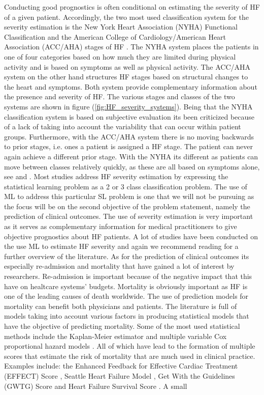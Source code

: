 \documentclass[../thesis.tex]{subfiles}
\begin{document}
\indent Conducting good prognostics is often conditional on estimating the severity of HF of a given patient. Accordingly, the two most used classification system for the severity estimation is the New York Heart Association (NYHA) Functional Classification \citep{new1994nomenclature} and the American College of Cardiology/American Heart Association (ACC/AHA) stages of HF \citep{hunt2001acc}. The NYHA system places the patients in one of four categories based on how much they are limited during physical activity and is based on symptoms as well as physical activity. The ACC/AHA system on the other hand structures HF stages based on structural changes to the heart and symptoms. Both system provide complementary information about the presence and severity of HF. The various stages and classes of the two systems are shown in figure (\ref{fig:HF_severity_systems}). Being that the NYHA classification system is based on subjective evaluation its been criticized because of a lack of taking into account the variability that can occur within patient groups. Furthermore, with the ACC/AHA system there is no moving backwards to prior stages, i.e. ones a patient is assigned a HF stage. The patient can never again achieve a different prior stage. With the NYHA its different as patients can move between classes relatively quickly, as these are all based on symptoms alone, see \cite{fleg2000assessment} and \cite{yancy2013}. Most studies address HF severity estimation by expressing the statistical learning problem as a 2 or 3 class classification problem. The use of ML to address this particular SL problem is one that we will not be pursuing as the focus will be on the second objective of the problem statement, namely the prediction of clinical outcomes. The use of severity estimation is very important as it serves as complementary information for medical practitioners to give objective prognostics about HF patients. A lot of studies have been conducted on the use ML to estimate HF severity and again we recommend reading \cite{tripoliti2017heart} for a further overview of the literature. As for the prediction of clinical outcomes its especially re-admission and mortality that have gained a lot of interest by researchers. Re-admission is important because of the negative impact that this have on healtcare systems' budgets. Mortality is obviously important as HF is one of the leading causes of death worldwide. The use of prediction models for mortality can benefit both physicians and patients. The literature is full of models taking into account various factors in producing statistical models that have the objective of predicting mortality. Some of the most used statistical methods include the Kaplan-Meier estimator \citep{kaplan1958nonparametric} and multiple variable Cox proportional hazard models \citep{cox1972regression}. All of which have lead to the formation of multiple scores that estimate the risk of mortality that are much used in clinical practice. Examples include: the Enhanced Feedback for Effective Cardiac Treatment (EFFECT) Score \citep{lee2003predicting}, Seattle Heart Failure Model \citep{levy2006seattle}, Get With the Guidelines (GWTG) Score \citep{peterson2010validated} and Heart Failure Survival Score \citep{ketchum2011multivariate}. A small 
\end{document}
